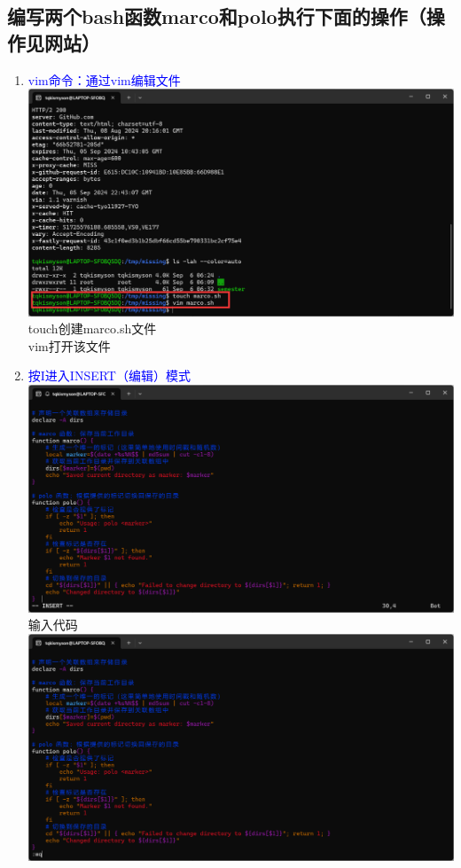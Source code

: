 \documentclass[12pt,a4paper,UTF8]{article}
\begin{document}
    \subsection{编写两个bash函数marco和polo执行下面的操作（操作见网站）}
    \begin{enumerate}
        \item \textcolor{blue}{vim命令：通过vim编辑文件}\\[8pt]
        \includegraphics[scale=0.25]{pictures/Shell/6_1.png}  
        touch创建marco.sh文件\\
        vim打开该文件\\[8pt]
        \item \textcolor{blue}{按I进入INSERT（编辑）模式}\\[8pt]
        \includegraphics[scale=0.25]{pictures/Shell/6_2.png}\\
        输入代码\\[8pt]
        \includegraphics[scale=0.25]{pictures/Shell/6_3.png}

\end{enumerate}
\end{document}
